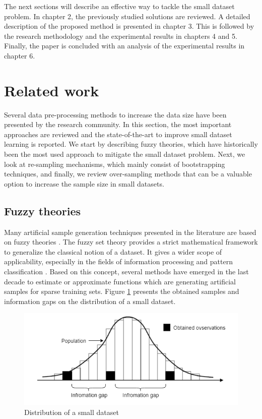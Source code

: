 \documentclass[parskip=full]{scrartcl}
\begin{document}
The next sections will describe an effective way to tackle the small dataset
problem. In chapter 2, the previously studied solutions are reviewed. A detailed
description of the proposed method is presented in chapter 3. This is followed
by the research methodology and the experimental results in chapters 4 and 5.
Finally, the paper is concluded with an analysis of the experimental results in
chapter 6.

\section{Related work}

Several data pre-processing methods to increase the data size have been
presented by the research community. In this section, the most important
approaches are reviewed and the state-of-the-art to improve small dataset
learning is reported. We start by describing fuzzy theories, which have
historically been the most used approach to mitigate the small dataset problem.
Next, we look at re-sampling mechanisms, which mainly consist of bootstrapping
techniques, and finally, we review over-sampling methods that can be a valuable
option to increase the sample size in small datasets.

\subsection{Fuzzy theories}

Many artificial sample generation techniques presented in the literature are
based on fuzzy theories \cite{AbdulLateh.2017}. The fuzzy set theory provides a
strict mathematical framework to generalize the classical notion of a dataset.
It gives a wider scope of applicability, especially in the fields of information
processing and pattern classification \cite{Zimmermann.2010}. Based on this
concept, several methods have emerged in the last decade to estimate or
approximate functions which are generating artificial samples for sparse
training sets. Figure \ref{fig:small-data-distribution} presents the obtained
samples and information gaps on the distribution of a small dataset.

\begin{figure}[H]
	\centering
	\includegraphics[width=0.6\linewidth]{../analysis/small_data_distribution.png}
	\caption{Distribution of a small dataset \cite{Tsai.2015}}
	\label{fig:small-data-distribution}
\end{figure}
\end{document}

